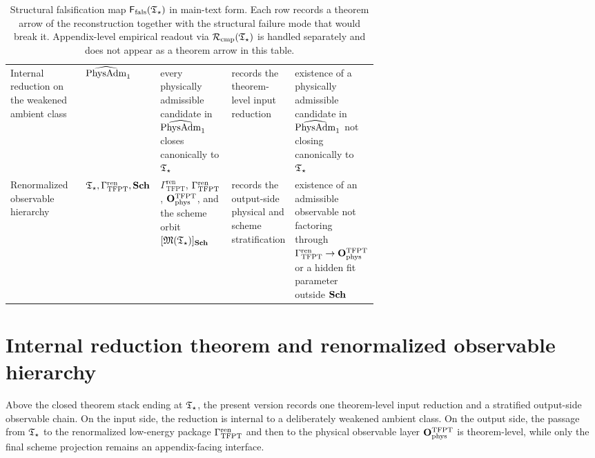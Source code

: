 \begin{table}[p]
\begin{tabularx}{\linewidth}{@{}>{\raggedright\arraybackslash}p{0.22\linewidth}>{\raggedright\arraybackslash}p{0.18\linewidth}>{\raggedright\arraybackslash}p{0.22\linewidth}YY@{}}
Internal reduction on the weakened ambient class & $\widehat{\mathrm{PhysAdm}}_1$ & every physically admissible candidate in $\widehat{\mathrm{PhysAdm}}_1$ closes canonically to $\mathfrak T_{\star}$ & records the theorem-level input reduction & existence of a physically admissible candidate in $\widehat{\mathrm{PhysAdm}}_1$ not closing canonically to $\mathfrak T_{\star}$ \\
Renormalized observable hierarchy & $\mathfrak T_{\star},\Gamma_{\mathrm{TFPT}}^{\mathrm{ren}},\mathbf{Sch}$ & $\Gamma_{\mathrm{TFPT}}^{\mathrm{ren}}$, $\Gamma_{\mathrm{TFPT}}^{\mathrm{ren}}$, $\mathbf O_{\mathrm{phys}}^{\mathrm{TFPT}}$, and the scheme orbit $[\mathfrak M(\mathfrak T_{\star})]_{\mathbf{Sch}}$ & records the output-side physical and scheme stratification & existence of an admissible observable not factoring through $\Gamma_{\mathrm{TFPT}}^{\mathrm{ren}}\to\mathbf O_{\mathrm{phys}}^{\mathrm{TFPT}}$ or a hidden fit parameter outside $\mathbf{Sch}$ \\
\bottomrule
\end{tabularx}
\caption{Structural falsification map $\Ffals(\Tstar)$ in main-text form. Each row records a
theorem arrow of the reconstruction together with the structural failure mode that would break
it. Appendix-level empirical readout via $\Rcmp(\Tstar)$ is handled separately and does not
appear as a theorem arrow in this table.}
\label{tab:proof-obligations}
\end{table}

\section{Internal reduction theorem and renormalized observable hierarchy}
\label{sec:universality-operational}

Above the closed theorem stack ending at $\mathfrak T_{\star}$, the present version records one theorem-level
input reduction and a stratified output-side observable chain. On the input side, the reduction is
internal to a deliberately weakened ambient class. On the output side, the passage from $\mathfrak T_{\star}$ to
the renormalized low-energy package $\Gamma_{\mathrm{TFPT}}^{\mathrm{ren}}$ and then to the physical observable layer
$\mathbf O_{\mathrm{phys}}^{\mathrm{TFPT}}$ is theorem-level, while only the final scheme projection remains an appendix-facing
interface.

